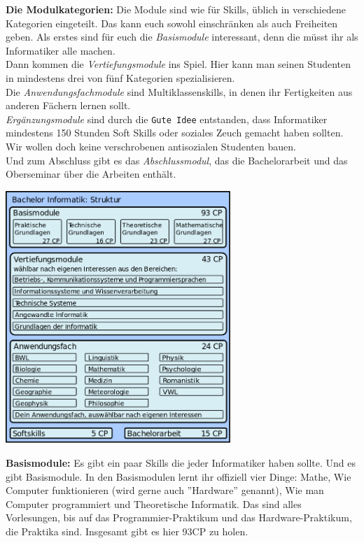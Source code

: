 \textbf{Die Modulkategorien:}
Die Module sind wie f\"ur Skills, \"ublich in verschiedene Kategorien
eingeteilt. Das kann euch sowohl einschr\"anken als auch Freiheiten geben.
Als erstes sind f\"ur euch die \emph{Basismodule} interessant, denn die m\"usst ihr als Informatiker alle machen.\\
Dann kommen die \emph{Vertiefungsmodule} ins Spiel. Hier kann man seinen Studenten in mindestens drei von f\"unf Kategorien spezialisieren.\\
Die \emph{Anwendungsfachmodule} sind Multiklassenskills, in denen ihr Fertigkeiten aus anderen F\"achern lernen sollt.\\
\emph{Erg\"anzungsmodule} sind durch die \texttt{Gute Idee\texttrademark} entstanden, dass Informatiker mindestens 150 Stunden Soft Skills oder soziales Zeuch gemacht haben sollten. Wir wollen doch keine verschrobenen antisozialen Studenten bauen.\\
Und zum Abschluss gibt es das \emph{Abschlussmodul}, das die Bachelorarbeit und das Oberseminar \"uber die Arbeiten enth\"alt.\\

\begin{center}
\includegraphics[width=85mm]{bilder/BacInfStruktur}
\end{center}


\textbf{Basismodule:}
Es gibt ein paar Skills die jeder Informatiker haben sollte. Und es gibt
Basismodule. In den Basismodulen lernt ihr offiziell vier Dinge: Mathe, Wie
Computer funktionieren (wird gerne auch ''Hardware'' genannt), Wie man Computer
programmiert und Theoretische Informatik. Das sind alles Vorlesungen, bis auf
das Programmier-Praktikum und das Hardware-Praktikum, die Praktika sind.
Insgesamt gibt es hier 93CP zu holen.

